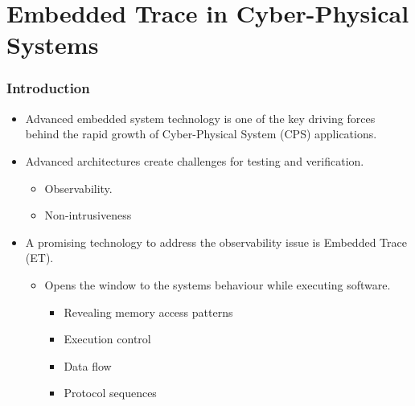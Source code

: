 \documentclass{beamer}
\begin{document}
\section{Embedded Trace in Cyber-Physical Systems}
\begin{frame}
    \frametitle{Introduction}
    \begin{itemize}
        \item Advanced embedded system technology is one of the key
            driving forces behind the rapid growth
            of Cyber-Physical System (CPS) applications.
        \item Advanced architectures create challenges for testing and
            verification.
            \begin{itemize}
                \item Observability.
                \item Non-intrusiveness
            \end{itemize}
        \item A promising technology to address the observability issue is
            Embedded Trace (ET).
            \begin{itemize}
                \item Opens the window to the systems behaviour while
                    executing software.
                    \begin{itemize}
                        \item Revealing memory access patterns
                        \item Execution control
                        \item Data flow
                        \item Protocol sequences
                    \end{itemize}
            \end{itemize}
    \end{itemize}
\end{frame}
\end{document}
